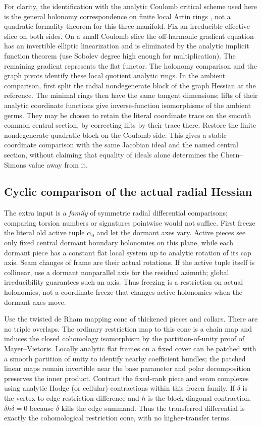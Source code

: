 For clarity, the identification with the analytic Coulomb critical
scheme used here is the general holonomy correspondence on finite
local Artin rings \cite[\S\S5--6]{GoldmanMillson}, not a quadratic
formality theorem for this three-manifold. Fix an irreducible
effective slice on both sides. On a small Coulomb slice the
off-harmonic gradient equation has an invertible elliptic
linearization and is eliminated by the analytic implicit function
theorem (use Sobolev degree high enough for multiplication). The
remaining gradient represents the flat functor. The holonomy
comparison and the graph pivots identify these local quotient
analytic rings. In the ambient comparison, first split the radial
nondegenerate block of the graph Hessian at the reference. The
minimal rings then have the same tangent dimensions; lifts of
their analytic coordinate functions give inverse-function
isomorphisms of the ambient germs. They may be chosen to retain
the literal coordinate trace on the smooth common central section,
by correcting lifts by their trace there. Restore the finite
nondegenerate quadratic block on the Coulomb side. This gives a
stable coordinate comparison with the same Jacobian ideal and the
named central section, without claiming that equality of ideals
alone determines the Chern--Simons value away from it.

\subsection{Cyclic comparison of the actual radial Hessian}
\label{classic:sec:cyclic}
The extra input is a \emph{family} of symmetric radial differential
comparisons; comparing torsion numbers or signatures pointwise would
not suffice. First freeze the literal old active tuple \(\alpha_0\)
and let the dormant axes vary. Active pieces see only fixed central
dormant boundary holonomies on this plane, while each dormant piece
has a constant flat local system up to analytic rotation of its
cap axis. Seam changes of frame are their actual rotations. If the
active tuple itself is collinear, use a dormant nonparallel axis
for the residual azimuth; global irreducibility guarantees such an
axis. Thus freezing is a restriction on actual holonomies, not a
coordinate freeze that changes active holonomies when the dormant
axes move.

Use the twisted de Rham mapping cone of thickened pieces and collars.
There are no triple overlaps. The ordinary restriction map to this
cone is a chain map and induces the closed cohomology isomorphism
by the partition-of-unity proof of Mayer--Vietoris. Locally
analytic flat frames on a fixed cover can be patched with a smooth
partition of unity to identify nearby coefficient bundles; the
patched linear maps remain invertible near the base parameter and
polar decomposition preserves the inner product. Contract the
fixed-rank piece and seam complexes using analytic Hodge (or cellular)
contractions within this frozen family. If \(\delta\) is the
vertex-to-edge restriction difference and \(h\) is the block-diagonal
contraction, \(\delta h\delta=0\) because \(\delta\) kills the edge
summand. Thus the transferred differential is exactly the
cohomological restriction cone, with no higher-transfer terms.

